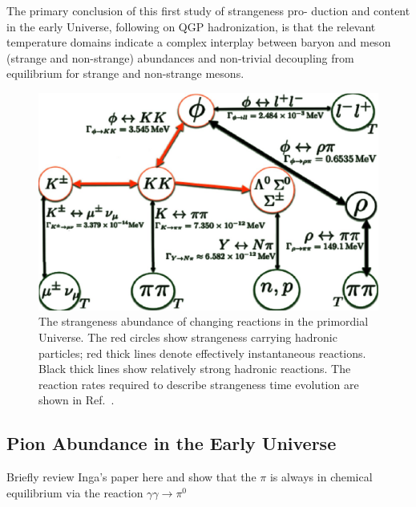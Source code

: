 \documentclass[Universe,article,submit,moreauthors,pdftex]{Definitions/mdpi}
\begin{document}
The primary conclusion of this first study of strangeness pro- duction and content in the early Universe, following on QGP hadronization, is that the relevant temperature domains indicate a complex interplay between baryon and meson (strange and non-strange) abundances and non-trivial decoupling from equilibrium for strange and non-strange mesons.
\begin{figure} %
\centering
\includegraphics[width=0.75\linewidth]{Strangeness002_newJ.jpg}
\caption{
The strangeness abundance of changing reactions in the primordial Universe. The red circles show strangeness carrying hadronic particles; red thick lines denote effectively instantaneous reactions. Black thick lines show relatively strong hadronic reactions. The reaction rates required to describe  strangeness time evolution are shown in Ref.\, \cite{Rafelski:2020pdi}.
}
\label{Strangeness_map2}
\end{figure}



\subsection{Pion Abundance in the Early Universe}\label{subsec:Pions}
{\color{blue}Briefly review Inga's paper \cite{Kuznetsova:2008jt} here and show that the $\pi$ is always in chemical equilibrium via the reaction $\gamma\gamma\to\pi^0$}
\end{document}
